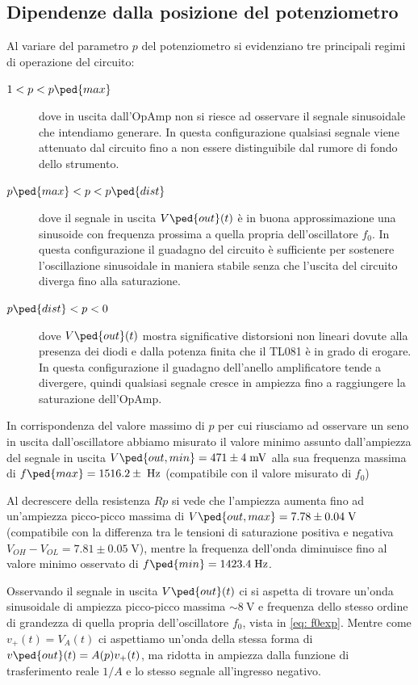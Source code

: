 \documentclass[10pt, a4paper, italian]{article}
\begin{document}
\subsection{Dipendenze dalla posizione del potenziometro}
Al variare del parametro $p$ del potenziometro si evidenziano tre principali
regimi di operazione del circuito:
\begin{description}
\item[$1 < p < p\ped{max}$]
dove in uscita dall'OpAmp non si riesce ad osservare il segnale sinusoidale
che intendiamo generare. In questa configurazione qualsiasi segnale viene
attenuato dal circuito fino a non essere distinguibile dal rumore di fondo
dello strumento.
\item[$p\ped{max} < p < p\ped{dist}$]\label{item: posc}
dove il segnale in uscita $V\ped{out} (t)$ è in buona approssimazione
una sinusoide con frequenza prossima a quella propria dell'oscillatore $f_0$.
In questa configurazione il guadagno del circuito è sufficiente per sostenere
l'oscillazione sinusoidale in maniera stabile senza che l'uscita del circuito
diverga fino alla saturazione.
\item[$p\ped{dist} < p < 0$]
dove $V\ped{out} (t)$ mostra significative distorsioni non lineari dovute alla
presenza dei diodi e dalla potenza finita che il TL081 è in grado di erogare.
In questa configurazione il guadagno dell'anello amplificatore tende a
divergere, quindi qualsiasi segnale cresce in ampiezza fino a raggiungere la
saturazione dell'OpAmp.
\end{description}

In corrispondenza del valore massimo di $p$ per cui riusciamo ad osservare un
seno in uscita dall'oscillatore abbiamo misurato il valore minimo assunto
dall'ampiezza del segnale in uscita $V\ped{out, min} = 471 \pm 4 \; \si{m\V}$
alla sua frequenza massima di $f\ped{max} = 1516.2 \pm \; \si{\Hz}$
(compatibile con il valore misurato di $f_0$)

Al decrescere della resistenza $Rp$ si vede che l'ampiezza aumenta fino ad
un'ampiezza picco-picco massima di $V\ped{out, max} = 7.78 \pm 0.04 \; \si{\V}$
(compatibile con la differenza tra le tensioni di saturazione positiva e
negativa $V_{OH} - V_{OL} = 7.81 \pm 0.05 \; \si{\V}$), mentre
la frequenza dell'onda diminuisce fino al valore minimo osservato di
$f\ped{min} = 1423.4 \; \si{\Hz}$.

Osservando il segnale in uscita $V\ped{out} (t)$ ci si aspetta di trovare
un'onda sinusoidale di ampiezza picco-picco massima $\sim \SI{8}{\V}$ e
frequenza dello stesso ordine di grandezza di quella propria dell'oscillatore
$f_0$, vista in \cref{eq: f0exp}.
Mentre come $v_+ (t) = V_A (t)$ ci aspettiamo un'onda della stessa forma di
$v\ped{out} (t) = A(p) v_+ (t)$, ma ridotta in ampiezza dalla funzione di
trasferimento reale $1/A$ e lo stesso segnale all'ingresso negativo.
\end{document}
